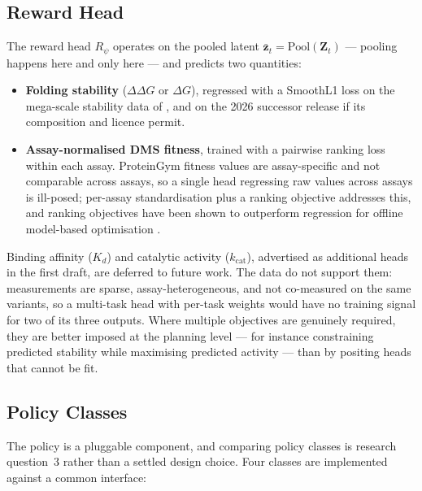 \documentclass[12pt, a4paper]{article}
\begin{document}
\subsection{Reward Head}
\label{sec:reward}

The reward head $R_\psi$ operates on the pooled latent $\bar{\mathbf{z}}_t = \mathrm{Pool}(\mathbf{Z}_t)$ --- pooling happens here and only here --- and predicts two quantities:

\begin{itemize}
    \item \textbf{Folding stability} ($\Delta\Delta G$ or $\Delta G$), regressed with a SmoothL1 loss on the mega-scale stability data of \citet{tsuboyama2023megascale}, and on the 2026 successor release \citep{rocklin2026stability} if its composition and licence permit.
    \item \textbf{Assay-normalised DMS fitness}, trained with a pairwise ranking loss within each assay. ProteinGym fitness values are assay-specific and not comparable across assays, so a single head regressing raw values across assays is ill-posed; per-assay standardisation plus a ranking objective addresses this, and ranking objectives have been shown to outperform regression for offline model-based optimisation \citep{tan2024rank}.
\end{itemize}

Binding affinity ($K_d$) and catalytic activity ($k_{\text{cat}}$), advertised as additional heads in the first draft, are deferred to future work. The data do not support them: measurements are sparse, assay-heterogeneous, and not co-measured on the same variants, so a multi-task head with per-task weights would have no training signal for two of its three outputs. Where multiple objectives are genuinely required, they are better imposed at the planning level --- for instance constraining predicted stability while maximising predicted activity --- than by positing heads that cannot be fit.

\subsection{Policy Classes}
\label{sec:policy}

The policy is a pluggable component, and comparing policy classes is research question~3 rather than a settled design choice. Four classes are implemented against a common interface:
\end{document}
